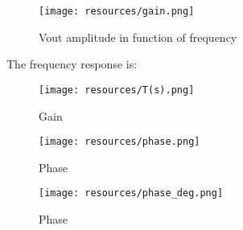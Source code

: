 \begin{figure} [!htb] 
  \texttt{[image: resources/gain.png]}
  \caption{Vout amplitude in function of frequency} 
  \label{fig:theoplots}
  \endminipage\hfill
\end{figure}

\FloatBarrier

The frequency response is:

\begin{figure} [!htb] 
  \texttt{[image: resources/T(s).png]}
  \caption{Gain} 
  \label{fig:theoplots}
  \endminipage\hfill
\end{figure}

\FloatBarrier

\begin{figure} [!htb] 
  \texttt{[image: resources/phase.png]}
  \caption{Phase} 
  \label{fig:theoplots}
  \endminipage\hfill
\end{figure}

\FloatBarrier

\begin{figure} [!htb] 
  \texttt{[image: resources/phase\_deg.png]}
  \caption{Phase} 
  \label{fig:theoplots}
  \endminipage\hfill
\end{figure}

\FloatBarrier




